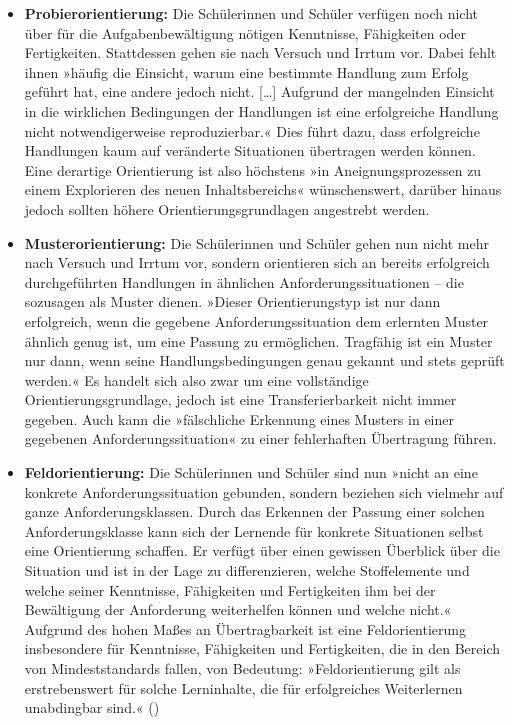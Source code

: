 \documentclass[
]{scrbook}
\theoremstyle{definition}
\theoremstyle{definition}
\theoremstyle{definition}
\theoremstyle{definition}
\theoremstyle{remark}
\begin{document}
\begin{itemize}
\item
  \textbf{Probierorientierung:} Die Schülerinnen und Schüler verfügen noch nicht über für die Aufgabenbewältigung nötigen Kenntnisse, Fähigkeiten oder Fertigkeiten. Stattdessen gehen sie nach Versuch und Irrtum vor. Dabei fehlt ihnen »häufig die Einsicht, warum eine bestimmte Handlung zum Erfolg geführt hat, eine andere jedoch nicht. {[}\ldots{]} Aufgrund der mangelnden Einsicht in die wirklichen Bedingungen der Handlungen ist eine erfolgreiche Handlung nicht notwendigerweise reproduzierbar.« Dies führt dazu, dass erfolgreiche Handlungen kaum auf veränderte Situationen übertragen werden können. Eine derartige Orientierung ist also höchstens »in Aneignungsprozessen zu einem Explorieren des neuen Inhaltsbereichs« wünschenswert, darüber hinaus jedoch sollten höhere Orientierungsgrundlagen angestrebt werden.
\item
  \textbf{Musterorientierung:} Die Schülerinnen und Schüler gehen nun nicht mehr nach Versuch und Irrtum vor, sondern orientieren sich an bereits erfolgreich durchgeführten Handlungen in ähnlichen Anforderungssituationen -- die sozusagen als Muster dienen.
  »Dieser Orientierungstyp ist nur dann erfolgreich, wenn die gegebene Anforderungssituation dem erlernten Muster ähnlich genug ist, um eine Passung zu ermöglichen. Tragfähig ist ein Muster nur dann, wenn seine Handlungsbedingungen genau gekannt und stets geprüft werden.«
  Es handelt sich also zwar um eine vollständige Orientierungsgrundlage, jedoch ist eine Transferierbarkeit nicht immer gegeben. Auch kann die »fälschliche Erkennung eines Musters in einer gegebenen Anforderungssituation« zu einer fehlerhaften Übertragung führen.
\item
  \textbf{Feldorientierung:} Die Schülerinnen und Schüler sind nun »nicht an eine konkrete Anforderungssituation gebunden, sondern beziehen sich vielmehr auf ganze Anforderungsklassen. Durch das Erkennen der Passung einer solchen Anforderungsklasse kann sich der Lernende für konkrete Situationen selbst eine Orientierung schaffen. Er verfügt über einen gewissen Überblick über die Situation und ist in der Lage zu differenzieren, welche Stoffelemente und welche seiner Kenntnisse, Fähigkeiten und Fertigkeiten ihm bei der Bewältigung der Anforderung weiterhelfen können und welche nicht.« Aufgrund des hohen Maßes an Übertragbarkeit ist eine Feldorientierung insbesondere für Kenntnisse, Fähigkeiten und Fertigkeiten, die in den Bereich von Mindeststandards fallen, von Bedeutung: »Feldorientierung gilt als erstrebenswert für solche Lerninhalte, die für erfolgreiches Weiterlernen unabdingbar sind.« ()
\end{itemize}
\end{document}
